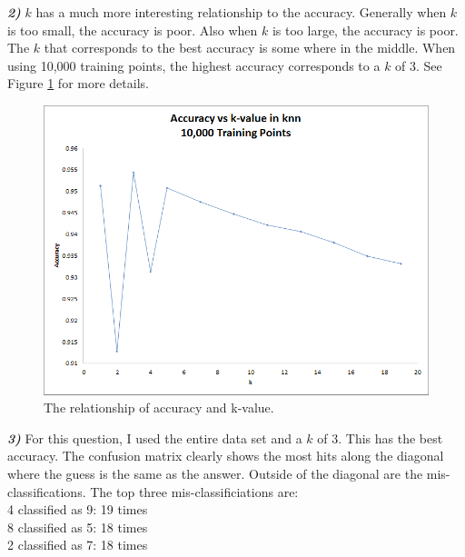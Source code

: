 \documentclass[10pt,letterpaper]{article}
\begin{document}
\textbf{\textit{2)}}
$k$ has a much more interesting relationship to the accuracy.  Generally when $k$ is too small, the accuracy is poor.  Also when $k$ is too large, the accuracy is poor.  The $k$ that corresponds to the best accuracy is some where in the middle.  When using 10,000 training points, the highest accuracy corresponds to a $k$ of 3.  See Figure \ref{fig:accuracyVsK} for more details.\\
\begin{figure}[h]
  \centering
  \includegraphics[scale=.4]{accuracyVskValue}
  \caption{The relationship of accuracy and k-value.}
  \label{fig:accuracyVsK}
\end{figure}



\textbf{\textit{3)}}
For this question, I used the entire data set and a $k$ of 3.  This has the best accuracy.  The confusion matrix clearly shows the most hits along the diagonal where the guess is the same as the answer.  Outside of the diagonal are the mis-classifications.  The top three mis-classificiations are:\\
4 classified as 9: 19 times\\
8 classified as 5: 18 times\\
2 classified as 7: 18 times
\end{document}
